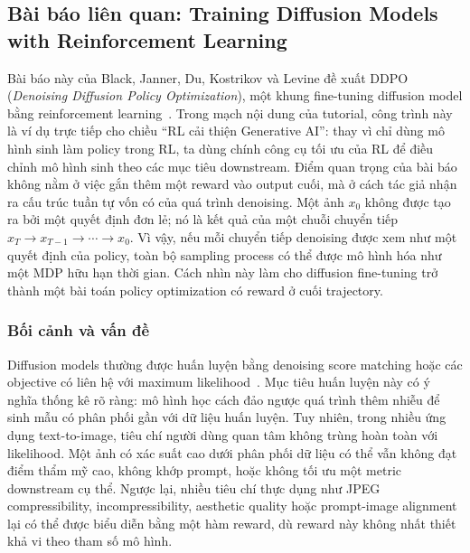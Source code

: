 \subsection*{Bài báo liên quan: Training Diffusion Models with Reinforcement Learning}

Bài báo này của Black, Janner, Du, Kostrikov và Levine đề xuất DDPO (\textit{Denoising Diffusion Policy Optimization}), một khung fine-tuning diffusion model bằng reinforcement learning~\citep{black2024ddpo}.
Trong mạch nội dung của tutorial, công trình này là ví dụ trực tiếp cho chiều ``RL cải thiện Generative AI'': thay vì chỉ dùng mô hình sinh làm policy trong RL, ta dùng chính công cụ tối ưu của RL để điều chỉnh mô hình sinh theo các mục tiêu downstream.
Điểm quan trọng của bài báo không nằm ở việc gắn thêm một reward vào output cuối, mà ở cách tác giả nhận ra cấu trúc tuần tự vốn có của quá trình denoising.
Một ảnh $x_0$ không được tạo ra bởi một quyết định đơn lẻ; nó là kết quả của một chuỗi chuyển tiếp $x_T \rightarrow x_{T-1}\rightarrow \cdots \rightarrow x_0$.
Vì vậy, nếu mỗi chuyển tiếp denoising được xem như một quyết định của policy, toàn bộ sampling process có thể được mô hình hóa như một MDP hữu hạn thời gian.
Cách nhìn này làm cho diffusion fine-tuning trở thành một bài toán policy optimization có reward ở cuối trajectory.

\subsubsection*{Bối cảnh và vấn đề}

Diffusion models thường được huấn luyện bằng denoising score matching hoặc các objective có liên hệ với maximum likelihood~\citep{ho2020ddpm}.
Mục tiêu huấn luyện này có ý nghĩa thống kê rõ ràng: mô hình học cách đảo ngược quá trình thêm nhiễu để sinh mẫu có phân phối gần với dữ liệu huấn luyện.
Tuy nhiên, trong nhiều ứng dụng text-to-image, tiêu chí người dùng quan tâm không trùng hoàn toàn với likelihood.
Một ảnh có xác suất cao dưới phân phối dữ liệu có thể vẫn không đạt điểm thẩm mỹ cao, không khớp prompt, hoặc không tối ưu một metric downstream cụ thể.
Ngược lại, nhiều tiêu chí thực dụng như JPEG compressibility, incompressibility, aesthetic quality hoặc prompt-image alignment lại có thể được biểu diễn bằng một hàm reward, dù reward này không nhất thiết khả vi theo tham số mô hình.

